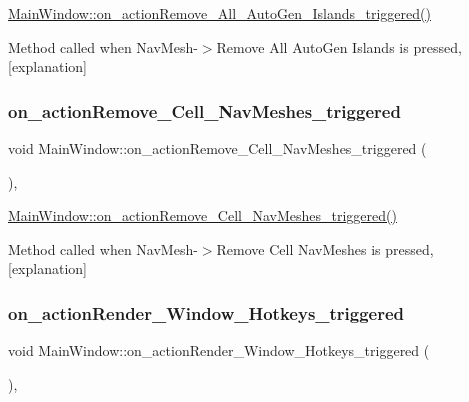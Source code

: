 \hyperlink{class_main_window_a184ce07aa200770c9862a049694e0ef0}{Main\+Window\+::on\+\_\+action\+Remove\+\_\+\+All\+\_\+\+Auto\+Gen\+\_\+\+Islands\+\_\+triggered()} 

Method called when Nav\+Mesh-\/$>$Remove All Auto\+Gen Islands is pressed, \mbox{[}explanation\mbox{]} \mbox{\label{class_main_window_a263f139f0eb0fe0f0986c71509a371f6}} 
\subsubsection{\texorpdfstring{on\+\_\+action\+Remove\+\_\+\+Cell\+\_\+\+Nav\+Meshes\+\_\+triggered}{on\_actionRemove\_Cell\_NavMeshes\_triggered}}
{\footnotesize\ttfamily void Main\+Window\+::on\+\_\+action\+Remove\+\_\+\+Cell\+\_\+\+Nav\+Meshes\+\_\+triggered (\begin{DoxyParamCaption}{ }\end{DoxyParamCaption})\hspace{0.3cm}{\ttfamily [private]}, {\ttfamily [slot]}}



\hyperlink{class_main_window_a263f139f0eb0fe0f0986c71509a371f6}{Main\+Window\+::on\+\_\+action\+Remove\+\_\+\+Cell\+\_\+\+Nav\+Meshes\+\_\+triggered()} 

Method called when Nav\+Mesh-\/$>$Remove Cell Nav\+Meshes is pressed, \mbox{[}explanation\mbox{]} \mbox{\label{class_main_window_a06cab8e06cb83d2e79c4bdd0e0cd5a88}} 
\subsubsection{\texorpdfstring{on\+\_\+action\+Render\+\_\+\+Window\+\_\+\+Hotkeys\+\_\+triggered}{on\_actionRender\_Window\_Hotkeys\_triggered}}
{\footnotesize\ttfamily void Main\+Window\+::on\+\_\+action\+Render\+\_\+\+Window\+\_\+\+Hotkeys\+\_\+triggered (\begin{DoxyParamCaption}{ }\end{DoxyParamCaption})\hspace{0.3cm}{\ttfamily [private]}, {\ttfamily [slot]}}



